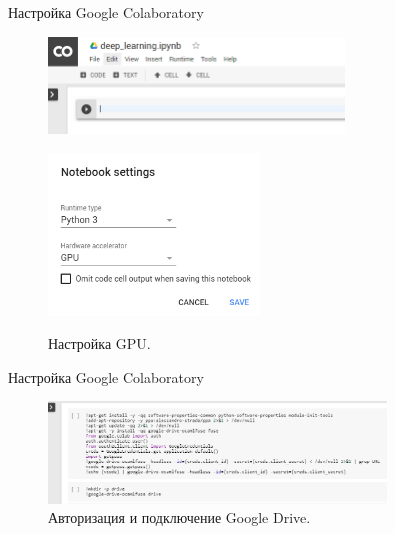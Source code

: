 \documentclass{beamer}
\begin{document}
\begin{frame}{Настройка Google Colaboratory}
\begin{figure}[h]
  \centering
\includegraphics[width=0.7\textwidth]{colab_settings_3.png}    %
\end{figure}

\begin{figure}[h]
  \centering
\includegraphics[width=0.5\textwidth]{colab_settings_2.png}\\    %
  \caption{Настройка GPU.}
\end{figure}
\end{frame}





\begin{frame}{Настройка Google Colaboratory}
\begin{figure}[h]
  \centering
\includegraphics[width=0.8\textwidth]{colab_settings_4.png}    %
  \caption{Авторизация и подключение Google Drive.}
\end{figure}
\end{frame}
\end{document}
